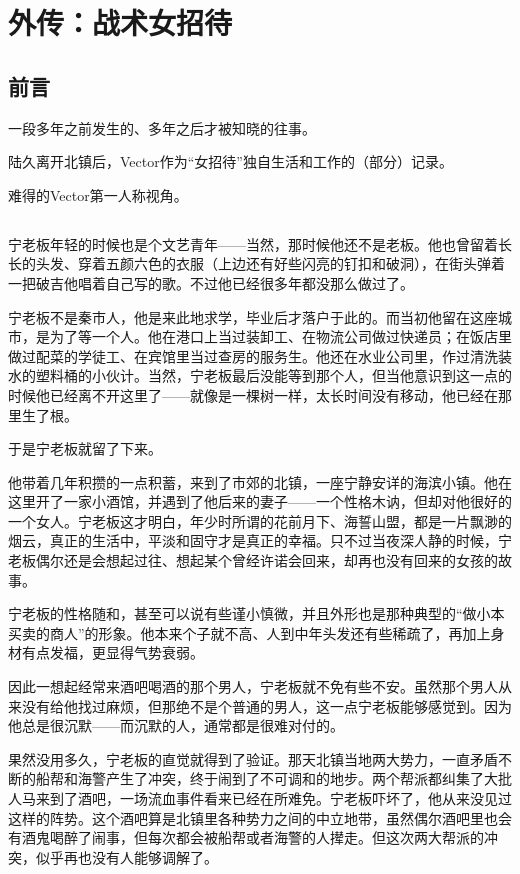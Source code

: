 \specialsectioning
\chapter{外传：战术女招待}

\section*{前言}

一段多年之前发生的、多年之后才被知晓的往事。

陆久离开北镇后，Vector作为“女招待”独自生活和工作的（部分）记录。

难得的Vector第一人称视角。

\section*{}

宁老板年轻的时候也是个文艺青年——当然，那时候他还不是老板。他也曾留着长长的头发、穿着五颜六色的衣服（上边还有好些闪亮的钉扣和破洞），在街头弹着一把破吉他唱着自己写的歌。不过他已经很多年都没那么做过了。

宁老板不是秦市人，他是来此地求学，毕业后才落户于此的。而当初他留在这座城市，是为了等一个人。他在港口上当过装卸工、在物流公司做过快递员；在饭店里做过配菜的学徒工、在宾馆里当过查房的服务生。他还在水业公司里，作过清洗装水的塑料桶的小伙计。当然，宁老板最后没能等到那个人，但当他意识到这一点的时候他已经离不开这里了——就像是一棵树一样，太长时间没有移动，他已经在那里生了根。

于是宁老板就留了下来。

他带着几年积攒的一点积蓄，来到了市郊的北镇，一座宁静安详的海滨小镇。他在这里开了一家小酒馆，并遇到了他后来的妻子——一个性格木讷，但却对他很好的一个女人。宁老板这才明白，年少时所谓的花前月下、海誓山盟，都是一片飘渺的烟云，真正的生活中，平淡和固守才是真正的幸福。只不过当夜深人静的时候，宁老板偶尔还是会想起过往、想起某个曾经许诺会回来，却再也没有回来的女孩的故事。

宁老板的性格随和，甚至可以说有些谨小慎微，并且外形也是那种典型的“做小本买卖的商人”的形象。他本来个子就不高、人到中年头发还有些稀疏了，再加上身材有点发福，更显得气势衰弱。

因此一想起经常来酒吧喝酒的那个男人，宁老板就不免有些不安。虽然那个男人从来没有给他找过麻烦，但那绝不是个普通的男人，这一点宁老板能够感觉到。因为他总是很沉默——而沉默的人，通常都是很难对付的。

果然没用多久，宁老板的直觉就得到了验证。那天北镇当地两大势力，一直矛盾不断的船帮和海警产生了冲突，终于闹到了不可调和的地步。两个帮派都纠集了大批人马来到了酒吧，一场流血事件看来已经在所难免。宁老板吓坏了，他从来没见过这样的阵势。这个酒吧算是北镇里各种势力之间的中立地带，虽然偶尔酒吧里也会有酒鬼喝醉了闹事，但每次都会被船帮或者海警的人撵走。但这次两大帮派的冲突，似乎再也没有人能够调解了。

